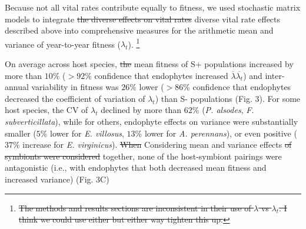 \documentclass[lineno, sn-basic]{sn-jnl}%
\providecommand{\DIFadd}[1]{{\protect\color{blue}#1}} %
\providecommand{\DIFdel}[1]{{\protect\color{red}\protect\scriptsize\sout{#1}}}
\providecommand{\DIFadd}[1]{{\protect\color{blue}\uwave{#1}}} %
\providecommand{\DIFdel}[1]{{\protect\color{red}\sout{#1}}}                      %
\providecommand{\DIFaddbegin}{} %
\providecommand{\DIFaddend}{} %
\providecommand{\DIFdelbegin}{} %
\providecommand{\DIFdelend}{} %
\newcommand{\DIFscaledelfig}{0.5}
\newlength{\DIFdelgraphicswidth} %
\newlength{\DIFdelgraphicsheight} %
\newcommand{\DIFaddincludegraphics}[2][]{{\color{blue}\fbox{\DIFOincludegraphics[#1]{#2}}}} %
\newcommand{\DIFdelincludegraphics}[2][]{%
\sbox{\DIFdelgraphicsbox}{\DIFOincludegraphics[#1]{#2}}%
\settoboxwidth{\DIFdelgraphicswidth}{\DIFdelgraphicsbox} %
\settoboxtotalheight{\DIFdelgraphicsheight}{\DIFdelgraphicsbox} %
\scalebox{\DIFscaledelfig}{%
\parbox[b]{\DIFdelgraphicswidth}{\usebox{\DIFdelgraphicsbox}\\[-\baselineskip] \rule{\DIFdelgraphicswidth}{0em}}\llap{\resizebox{\DIFdelgraphicswidth}{\DIFdelgraphicsheight}{%
\setlength{\unitlength}{\DIFdelgraphicswidth}%
\begin{picture}(1,1)%
\thicklines\linethickness{2pt} %
{\color[rgb]{1,0,0}\put(0,0){\framebox(1,1){}}}%
{\color[rgb]{1,0,0}\put(0,0){\line( 1,1){1}}}%
{\color[rgb]{1,0,0}\put(0,1){\line(1,-1){1}}}%
\end{picture}%
}\hspace*{3pt}}} %
} %
\DeclareRobustCommand{\DIFaddbegin}{\DIFOaddbegin \let\includegraphics\DIFaddincludegraphics} %
\DeclareRobustCommand{\DIFaddend}{\DIFOaddend \let\includegraphics\DIFOincludegraphics} %
\DeclareRobustCommand{\DIFdelbegin}{\DIFOdelbegin \let\includegraphics\DIFdelincludegraphics} %
\DeclareRobustCommand{\DIFdelend}{\DIFOaddend \let\includegraphics\DIFOincludegraphics} %
\begin{document}
Because not all vital rates contribute equally to fitness, we used stochastic matrix models to integrate \DIFdelbegin \DIFdel{the diverse effects on vital rates }\DIFdelend \DIFaddbegin \DIFadd{diverse vital rate effects }\DIFaddend described above into comprehensive measures for the arithmetic mean and variance of year-to-year fitness ($\lambda_{t}$).
\DIFdelbegin \footnote{\DIFdel{The methods and results sections are inconsistent in their use of $\lambda$ vs $\lambda_t$. I think we could use either but either way tighten this up.}} 
\addtocounter{footnote}{-1}%
\DIFdelend On average across host species, \DIFdelbegin \DIFdel{the }\DIFdelend mean fitness of S+ populations increased by more than $10\%$ ($>92$\% confidence that endophytes increased \DIFdelbegin \DIFdel{$\overline{\lambda}$}\DIFdelend \DIFaddbegin \DIFadd{$\overline{\lambda_{t}}$}\DIFaddend ) and inter-annual variability in fitness was $26\%$ lower ($>86$\% confidence that endophytes decreased the coefficient of variation of $\lambda_{t}$) than S- populations (Fig. 3).
For some host species, the CV of $\lambda_{t}$ declined by more than $62$\% (\emph{P. alsodes}, \emph{F. subverticillata}), while for others, endophyte effects on variance were substantially smaller ($5$\% lower for \emph{E. villosus}, $13$\% lower for \emph{A. perennans}), or even positive ($37$\% increase for \emph{E. virginicus}).
\DIFdelbegin \DIFdel{When }\DIFdelend \DIFaddbegin \DIFadd{Considering }\DIFaddend mean and variance effects \DIFdelbegin \DIFdel{of symbionts were considered }\DIFdelend together, none of the host-symbiont pairings were antagonistic (i.e., with endophytes that both decreased mean fitness and increased variance) (Fig. 3C)
\end{document}
